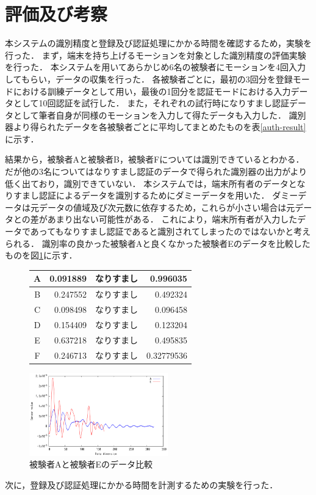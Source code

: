 \section{評価及び考察}
本システムの識別精度と登録及び認証処理にかかる時間を確認するため，実験を行った．
まず，端末を持ち上げるモーションを対象とした識別精度の評価実験を行った．
本システムを用いてあらかじめ6名の被験者にモーションを4回入力してもらい，データの収集を行った．
各被験者ごとに，最初の3回分を登録モードにおける訓練データとして用い，最後の1回分を認証モードにおける入力データとして10回認証を試行した．
また，それぞれの試行時になりすまし認証データとして筆者自身が同様のモーションを入力して得たデータも入力した．
識別器より得られたデータを各被験者ごとに平均してまとめたものを表\ref{auth-result}に示す．

結果から，被験者Aと被験者B，被験者Fについては識別できているとわかる．
だが他の3名についてはなりすまし認証のデータで得られた識別器の出力がより低く出ており，識別できていない．
本システムでは，端末所有者のデータとなりすまし認証によるデータを識別するためにダミーデータを用いた．
ダミーデータは元データの値域及び次元数に依存するため，これらが小さい場合は元データとの差があまり出ない可能性がある．
これにより，端末所有者が入力したデータであってもなりすまし認証であると識別されてしまったのではないかと考えられる．
識別率の良かった被験者Aと良くなかった被験者Eのデータを比較したものを図\ref{compare}に示す．

\begin{figure}[!tbhp]
  \def\@captype{table}
  \begin{minipage}{.48\textwidth}
    \centering
    \label{auth-result}
    \begin{tabular}{|c|r||c|r|} \hline
      A & 0.091889 & なりすまし & 0.996035 \\ \hline
      B & 0.247552 & なりすまし & 0.492324 \\ \hline
      C & 0.098498 & なりすまし & 0.096458 \\ \hline
      D & 0.154409 & なりすまし & 0.123204 \\ \hline
      E & 0.637218 & なりすまし & 0.495835 \\ \hline
      F & 0.246713 & なりすまし & 0.32779536 \\ \hline
    \end{tabular}
  \end{minipage}
  \hfill
  \begin{minipage}{.48\textwidth}
    \centering
    \includegraphics[bb=0 0 360 216, width=6cm]{Graphs/comp.pdf}
    \caption{被験者Aと被験者Eのデータ比較}
    \label{compare}
  \end{minipage}
\end{figure}


次に，登録及び認証処理にかかる時間を計測するための実験を行った．
